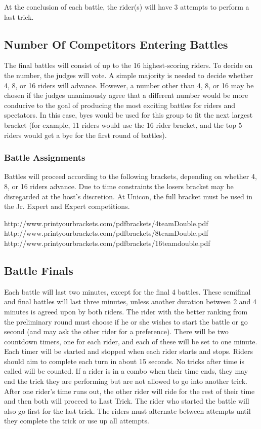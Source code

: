 At the conclusion of each battle, the rider(s) will have 3 attempts to perform a last trick.

\subsection{Number Of Competitors Entering Battles}
The final battles will consist of up to the 16 highest-scoring riders.
To decide on the number, the judges will vote.
A simple majority is needed to decide whether 4, 8, or 16 riders will advance.
However, a number other than 4, 8, or 16 may be chosen if the judges unanimously agree that a different number would be more conducive to the goal of producing the most exciting battles for riders and spectators.
In this case, byes would be used for this group to fit the next largest bracket (for example, 11 riders would use the 16 rider bracket, and the top 5 riders would get a bye for the first round of battles).

\subsubsection{Battle Assignments}
Battles will proceed according to the following brackets, depending on whether 4, 8, or 16 riders advance. Due to time constraints the losers bracket may be disregarded at the host's discretion. At Unicon, the full bracket must be used in the Jr. Expert and Expert competitions.

http://www.printyourbrackets.com/pdfbrackets/4teamDouble.pdf \\
http://www.printyourbrackets.com/pdfbrackets/8teamDouble.pdf \\
http://www.printyourbrackets.com/pdfbrackets/16teamdouble.pdf

\subsection{Battle Finals}
Each battle will last two minutes, except for the final 4 battles.
These semifinal and final battles will last three minutes, unless another duration between 2 and 4 minutes is agreed upon by both riders.
The rider with the better ranking from the preliminary round must choose if he or she wishes to start the battle or go second (and may ask the other rider for a preference).
There will be two countdown timers, one for each rider, and each of these will be set to one minute.
Each timer will be started and stopped when each rider starts and stops.
Riders should aim to complete each turn in about 15 seconds.
No tricks after time is called will be counted.
If a rider is in a combo when their time ends, they may end the trick they are performing but are not allowed to go into another trick.
After one rider's time runs out, the other rider will ride for the rest of their time and then both will proceed to Last Trick.
The rider who started the battle will also go first for the last trick.
The riders must alternate between attempts until they complete the trick or use up all attempts.
